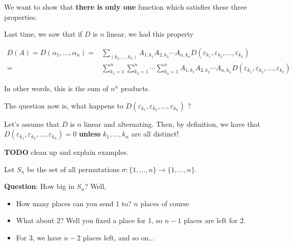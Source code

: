 \documentclass[12pt]{article}
\def\eps{\varepsilon}
\newcommand{\TODO}{\color{red}\textbf{TODO}\color{black}}
\begin{document}
  We want to show that {\bf there is only one} function which satisfies these
  three properties.

  Last time, we saw that if $D$ is $n$ linear, we had this property

  \begin{align*}
    D(A) = D(\alpha_1, \dots, \alpha_n) =& \sum_{(k_1, \dots, k_n)} A_{1, k_1} A_{2, k_2} \cdots A_{n, k_n} D(\eps_{k_1}, \eps_{k_2}, \dots, \eps_{k_2}) \\
    =& \sum_{k_1 = 1}^n \sum_{k_2 = 1}^n \cdots \sum_{k_n = 1}^n A_{1, k_1} A_{2, k_2} \cdots A_{n, k_n} D(\eps_{k_1}, \eps_{k_2}, \dots, \eps_{k_2})
  \end{align*}

  In other words, this is the sum of $n^n$ products.

  The question now is, what happens to $D(\eps_{k_1}, \eps_{k_2}, \dots,
  \eps_{k_n})$ ?

  Let's assume that $D$ is $n$ linear and alternating. Then, by definition, we
  have that $D(\eps_{k_1}, \eps_{k_2}, \dots, \eps_{k_n}) = 0$ {\bf unless}
  $k_1, \dots, k_n$ are all distinct!


  \TODO{} clean up and explain examples.


  Let $S_n$ be the set of all permutations $\sigma: \{1, \dots, n\} \to \{1,
  \dots, n\}$.

  {\bf Question}: How big in $S_n$? Well,

  \begin{itemize}
    \item How many places can you send $1$ to? $n$ places of course
    \item What about 2? Well you fixed a place for 1, so $n - 1$ places are left
      for 2.
    \item For 3, we have $n - 2$ places left, and so on...
  \end{itemize}
\end{document}
